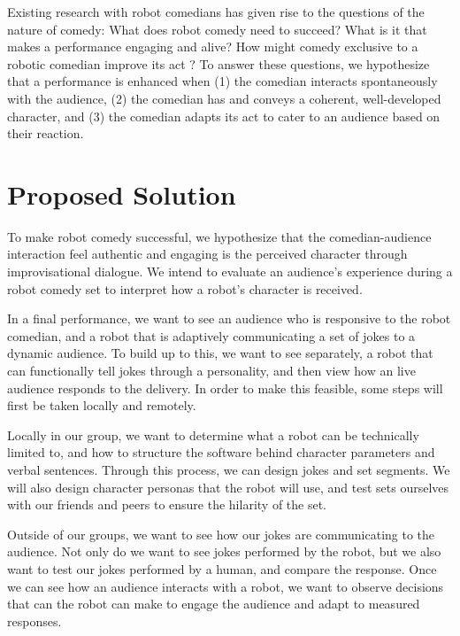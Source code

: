 \documentclass[onecolumn, draftclsnofoot,10pt, compsoc]{IEEEtran}
\begin{document}
Existing research with robot comedians has given rise to the questions of the nature of comedy: What does robot comedy need to succeed? What is it that makes a performance engaging and alive? How might comedy exclusive to a robotic comedian improve its act {\cite{RobotsMakeThings:2008}}? To answer these questions, we hypothesize that a performance is enhanced when (1) the comedian interacts spontaneously with the audience, (2) the comedian has and conveys a coherent, well-developed character, and (3) the comedian adapts its act to cater to an audience based on their reaction.







\section{Proposed Solution}

To make robot comedy successful, we hypothesize that the comedian-audience interaction feel authentic and engaging is the perceived character through improvisational dialogue. We intend to evaluate an audience's experience during a robot comedy set to interpret how a robot’s character is received.

In a final performance, we want to see an audience who is responsive to the robot comedian, and a robot that is adaptively communicating a set of jokes to a dynamic audience. To build up to this, we want to see separately, a robot that can functionally tell jokes through a personality, and then view how an live audience responds to the delivery. In order to make this feasible, some steps will first be taken locally and remotely.

Locally in our group, we want to determine what a robot can be technically limited to, and how to structure the software behind character parameters and verbal sentences. Through this process, we can design jokes and set segments. We will also design character personas that the robot will use, and test sets ourselves with our friends and peers to ensure the hilarity of the set.

Outside of our groups, we want to see how our jokes are communicating to the audience. Not only do we want to see jokes performed by the robot, but we also want to test our jokes performed by a human, and compare the response. Once we can see how an audience interacts with a robot, we want to observe decisions that can the robot can make to engage the audience and adapt to measured responses.
\end{document}
